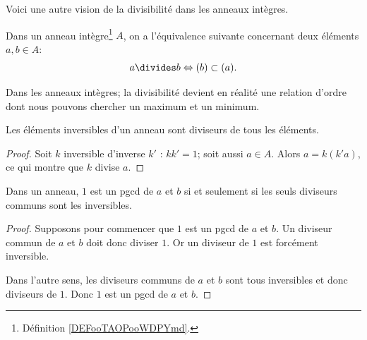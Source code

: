 Voici une autre vision de la divisibilité dans les anneaux intègres.
\begin{proposition}\label{PropDiviseurIdeaux}
    Dans un anneau intègre\footnote{Définition \ref{DEFooTAOPooWDPYmd}.} $A$, on a l'équivalence suivante concernant deux éléments \( a, b \in A \):
\begin{equation}
    a\divides b\Leftrightarrow (b)\subset (a).
\end{equation}
\end{proposition}

Dans les anneaux intègres; la divisibilité devient en réalité une relation d'ordre dont nous pouvons chercher un maximum et un minimum.

\begin{lemma}
    Les éléments inversibles d'un anneau sont diviseurs de tous les éléments.
\end{lemma}

\begin{proof}
    Soit \( k\) inversible d'inverse \( k'\) : \( kk'=1\); soit aussi \( a\in A\). Alors \( a=k(k'a)\), ce qui montre que \( k\) divise \( a\).
\end{proof}

\begin{lemma}
    Dans un anneau, \( 1\) est un pgcd de \( a\) et \( b\) si et seulement si les seuls diviseurs communs sont les inversibles.
\end{lemma}

\begin{proof}
    Supposons pour commencer que \( 1\) est un pgcd de \( a\) et \( b\). Un diviseur commun de \( a\) et \( b\) doit donc diviser \( 1\). Or un diviseur de \( 1\) est forcément inversible.

    Dans l'autre sens, les diviseurs communs de \( a\) et \( b\) sont tous inversibles et donc diviseurs de \( 1\). Donc \( 1\) est un pgcd de \( a\) et \( b\).
\end{proof}
